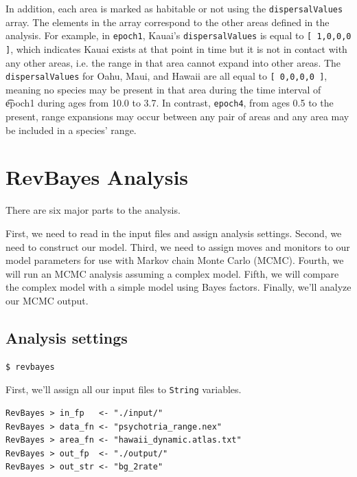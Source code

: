 In addition, each area is marked as habitable or not using the {\tt dispersalValues} array.
The elements in the array correspond to the other areas defined in the analysis.
For example, in {\tt epoch1}, Kauai's {\tt dispersalValues} is equal to {\tt [ 1,0,0,0 ]}, which indicates Kauai exists at that point in time but it is not in contact with any other areas, i.e. the range in that area cannot expand into other areas.
The {\tt dispersalValues} for Oahu, Maui, and Hawaii are all equal to {\tt [ 0,0,0,0 ]}, meaning no species may be present in that area during the time interval of {\t epoch1} during ages from 10.0 to 3.7. In contrast, {\tt epoch4}, from ages 0.5 to the present, range expansions may occur between any pair of areas and any area may be included in a species' range.

\section{RevBayes Analysis}

There are six major parts to the analysis.

First, we need to read in the input files and assign analysis settings.
Second, we need to construct our model.
Third, we need to assign moves and monitors to our model parameters for use with Markov chain Monte Carlo (MCMC).
Fourth, we will run an MCMC analysis assuming a complex model.
Fifth, we will compare the complex model with a simple model using Bayes factors.
Finally, we'll analyze our MCMC output.

\subsection{Analysis settings}

\setlength{\parindent}{0pt}


\begin{snugshade}
\begin{lstlisting}
$ revbayes
\end{lstlisting}
\end{snugshade}

First, we'll assign all our input files to {\tt String} variables.
\begin{snugshade}
\begin{lstlisting}
RevBayes > in_fp   <- "./input/"
RevBayes > data_fn <- "psychotria_range.nex"
RevBayes > area_fn <- "hawaii_dynamic.atlas.txt"
RevBayes > out_fp  <- "./output/"
RevBayes > out_str <- "bg_2rate"
\end{lstlisting}
\end{snugshade}

